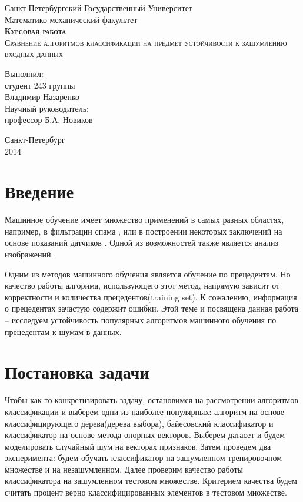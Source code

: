 \documentclass{article}
\begin{document}
\begin{titlepage}

\begin{center}
Санкт-Петербургский Государственный Университет\\
Математико-механический факультет\\
\vspace{12em}
\textsc{\textbf{Курсовая работа\\}Сравнение алгоритмов классификации на предмет устойчивости к зашумлению входных данных}
\end{center}
\vspace{10em}
\begin{flushright}
Выполнил:\\
студент 243 группы\\
Владимир Назаренко\\
\vspace{1em}
Научный руководитель:\\
профессор Б.А. Новиков
\end{flushright}
\vspace{\fill}
\center
Санкт-Петербург\\2014
\end{titlepage}



\section{Введение}
Машинное обучение имеет множество применений в самых разных областях, например, в фильтрации спама \cite{spamFiltering}, или в построении некоторых заключений на основе показаний датчиков \cite{sensors}. Одной из возможностей также является анализ изображений.

Одним из методов машинного обучения является обучение по прецедентам.
Но качество работы алгорима, использующего этот метод, напрямую зависит от корректности и количества прецедентов(training set). К сожалению, информация о прецедентах зачастую содержит ошибки. Этой теме и посвящена данная работа -- исследуем устойчивость популярных алгоритмов машинного обучения по прецедентам к шумам в данных.



\section{Постановка задачи}
Чтобы как-то конкретизировать задачу, остановимся на рассмотрении алгоритмов классификации и выберем одни из наиболее популярных:
алгоритм на основе классифицирующего дерева(дерева выбора), байесовский классификатор и классификатор на основе метода опорных векторов. Выберем датасет и будем моделировать случайный шум на векторах признаков. Затем проведем два эксперимента: будем обучать классификатор на зашумленном тренировочном множестве и на незашумленном. Далее проверим качество работы классификатора на зашумленном тестовом множестве. Критерием качества будем считать процент верно классифицированных элементов в тестовом множестве. 
\end{document}
